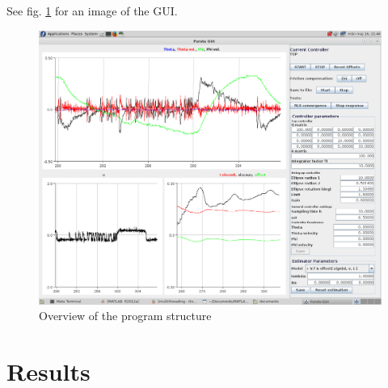 \documentclass[10pt,a4paper]{article}
\begin{document}
See fig. \ref{fig:gui} for an image of the GUI.

\begin{figure}[H]
\centerline{\includegraphics[width=1.4\textwidth]{gui.png}}
\caption{Overview of the program structure}
\label{fig:gui}
\end{figure}

\clearpage
\section{Results}
\end{document}
